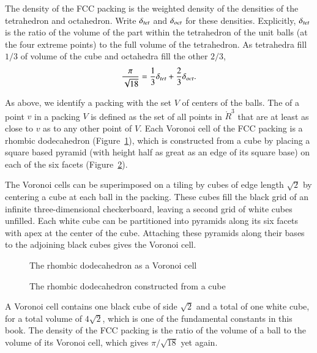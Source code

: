The density of the FCC packing is the weighted density
of the densities of the tetrahedron and octahedron.  Write $\delta_{tet}$ and
$\delta_{oct}$ for these densities.  Explicitly, $\delta_{tet}$ is the ratio of the
volume of the part within the tetrahedron of the unit balls (at the
four extreme points) to the full volume of the tetrahedron.  As tetrahedra fill
$1/3$ of volume of the cube and octahedra fill
the other $2/3$,
\begin{displaymath}
  \frac{\pi}{\sqrt{18}} = \frac{1}{3}\delta_{tet} + \frac{2}{3}\delta_{oct}.
\end{displaymath}

As above, we identify a packing with the set $V$ of centers of the balls.
The  of a point $v$ in a packing $V$ is defined as the set of all
points in $\ring{R}^3$ 
that are at least as close to $v$ as to any other point
of $V$.  Each Voronoi cell of the FCC packing is a
rhombic dodecahedron (Figure~\ref{fig:rhombic}),  %
which is constructed from a cube by placing a
square based pyramid (with height half as great as an edge of its
square base) on each of the six facets
(Figure~\ref{fig:rhombic-cube}).  %

The Voronoi cells can be superimposed on a tiling by cubes of edge length $\sqrt2$ by
centering a cube at each ball in the packing. These
cubes fill the black grid of an infinite three-dimensional
checkerboard, leaving a second grid of white cubes unfilled.  Each
white cube can be partitioned into pyramids along its six facets with apex
at the center of the cube.  Attaching these pyramids along their bases
to the adjoining black cubes gives the Voronoi cell.

\begin{figure}[htb]
  \centering
  \caption{The rhombic dodecahedron as a Voronoi cell}
  \label{fig:rhombic}
\end{figure}

\begin{figure}[htb]
  \centering
  \caption{The rhombic dodecahedron constructed from a cube}
  \label{fig:rhombic-cube}
\end{figure}

A Voronoi cell contains one black cube of side $\sqrt2$ and a total
of one white cube, for a total volume of $4\sqrt2$, which is
one of the fundamental constants in this book.  The density of the
FCC packing is the ratio of the volume of a ball to the volume
of its Voronoi cell, which gives $\pi/\sqrt{18}$ yet again.





